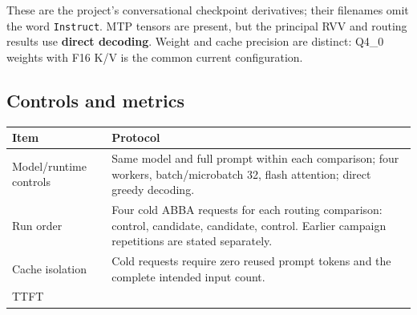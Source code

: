 \documentclass[10pt,a4paper]{article}
\begin{document}
These are the project's conversational checkpoint derivatives; their
filenames omit the word \nolinkurl{Instruct}. MTP tensors are present,
but the principal RVV and routing results use \textbf{direct decoding}.
Weight and cache precision are distinct: Q4\_0 weights with F16 K/V is
the common current configuration.

\hypertarget{controls-and-metrics}{%
\subsection{Controls and metrics}\label{controls-and-metrics}}

\begin{longtable}[]{@{}ll@{}}
\toprule
\begin{minipage}[b]{0.47\columnwidth}\raggedright
Item\strut
\end{minipage} & \begin{minipage}[b]{0.47\columnwidth}\raggedright
Protocol\strut
\end{minipage}\tabularnewline
\midrule
\endhead
\begin{minipage}[t]{0.47\columnwidth}\raggedright
Model/runtime controls\strut
\end{minipage} & \begin{minipage}[t]{0.47\columnwidth}\raggedright
Same model and full prompt within each comparison; four workers,
batch/microbatch 32, flash attention; direct greedy decoding.\strut
\end{minipage}\tabularnewline
\begin{minipage}[t]{0.47\columnwidth}\raggedright
Run order\strut
\end{minipage} & \begin{minipage}[t]{0.47\columnwidth}\raggedright
Four cold ABBA requests for each routing comparison: control, candidate,
candidate, control. Earlier campaign repetitions are stated
separately.\strut
\end{minipage}\tabularnewline
\begin{minipage}[t]{0.47\columnwidth}\raggedright
Cache isolation\strut
\end{minipage} & \begin{minipage}[t]{0.47\columnwidth}\raggedright
Cold requests require zero reused prompt tokens and the complete
intended input count.\strut
\end{minipage}\tabularnewline
\begin{minipage}[t]{0.47\columnwidth}\raggedright
TTFT\strut
\end{minipage} & \begin{minipage}[t]{0.47\columnwidth}\raggedright

\end{minipage}
\end{longtable}
\end{document}
